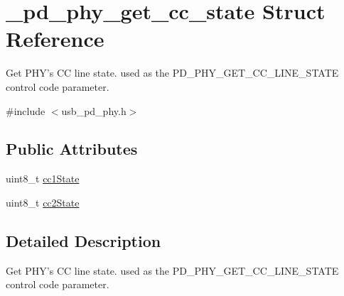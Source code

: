 \hypertarget{struct__pd__phy__get__cc__state}{\section{\-\_\-pd\-\_\-phy\-\_\-get\-\_\-cc\-\_\-state Struct Reference}
\label{struct__pd__phy__get__cc__state}
}


Get P\-H\-Y's C\-C line state. used as the P\-D\-\_\-\-P\-H\-Y\-\_\-\-G\-E\-T\-\_\-\-C\-C\-\_\-\-L\-I\-N\-E\-\_\-\-S\-T\-A\-T\-E control code parameter.  




{\ttfamily \#include $<$usb\-\_\-pd\-\_\-phy.\-h$>$}

\subsection*{Public Attributes}
\begin{DoxyCompactItemize}
\item 
uint8\-\_\-t \hyperlink{struct__pd__phy__get__cc__state_a551804e47b7f897e9e4ca61e0af9caf3}{cc1\-State}
\item 
uint8\-\_\-t \hyperlink{struct__pd__phy__get__cc__state_af32a14cc7bbfad052b927f765176aac8}{cc2\-State}
\end{DoxyCompactItemize}


\subsection{Detailed Description}
Get P\-H\-Y's C\-C line state. used as the P\-D\-\_\-\-P\-H\-Y\-\_\-\-G\-E\-T\-\_\-\-C\-C\-\_\-\-L\-I\-N\-E\-\_\-\-S\-T\-A\-T\-E control code parameter. 

